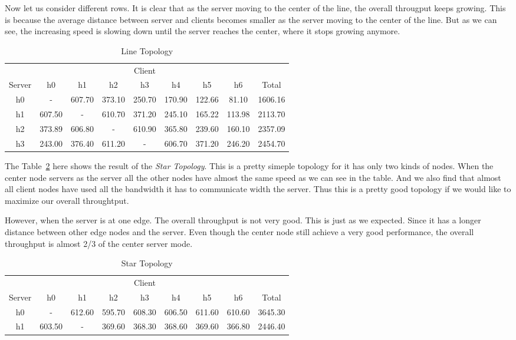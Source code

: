Now let us consider different rows. It is clear that as the server moving to the center of 
the line, the overall througput keeps growing. This is because the average distance between
server and clients becomes smaller as the server moving to the center of the line. But as we 
can see, the increasing speed is slowing down until the server reaches the center, where it 
stops growing anymore.
\begin{table}
	\renewcommand{\arraystretch}{1.3}
	\caption{Line Topology}
	\label{table:line}
	\setlength\tabcolsep{4pt} %
	\centering
	\begin{tabular}{|c||c|c|c|c|c|c|c||c|}
		\hline
		       & \multicolumn{7}{c||}{Client} &  \\ \hhline{|~||-------||~|}
		Server & h0 & h1 & h2 & h3 & h4 & h5 & h6 & Total\\
\hline\hline
h0 &     -    &  607.70  &  373.10  &  250.70  &  170.90  &  122.66  &  81.10  & 1606.16 \\
\hline
h1 &  607.50  &     -    &  610.70  &  371.20  &  245.10  &  165.22  &  113.98  & 2113.70 \\
\hline
h2 &  373.89  &  606.80  &     -    &  610.90  &  365.80  &  239.60  &  160.10  & 2357.09 \\
\hline
h3 &  243.00  &  376.40  &  611.20  &     -    &  606.70  &  371.20  &  246.20  & 2454.70 \\
\hline
	\end{tabular}
\end{table}

The Table~\ref{table:star} here shows the result of the {\it Star Topology}. This is a pretty
simeple topology for it has only two kinds of nodes. When the center node servers as the server 
all the other nodes have almost the same speed as we can see in the table. And we also find that 
almost all client nodes have used all the bandwidth it has to communicate width the server.
Thus this is a pretty good topology if we would like to maximize our overall throughtput.

However, when the server is at one edge. The overall throughput is not very good. This is just as
we expected. Since it has a longer distance between other edge nodes and the server. Even though 
the center node still achieve a very good performance, the overall throughput is almost 2/3 of the
center server mode.
\begin{table}
	\renewcommand{\arraystretch}{1.3}
	\caption{Star Topology}
	\label{table:star}
	\setlength\tabcolsep{4pt}
	\centering
	\begin{tabular}{|c||c|c|c|c|c|c|c||c|}
		\hline
		       & \multicolumn{7}{c||}{Client} &  \\ \hhline{|~||-------||~|}
		Server & h0 & h1 & h2 & h3 & h4 & h5 & h6 & Total\\
\hline\hline
h0 &     -    &  612.60  &  595.70  &  608.30  &  606.50  &  611.60  &  610.60  & 3645.30 \\
\hline
h1 &  603.50  &    -     &  369.60  &  368.30  &  368.60  &  369.60  &  366.80  & 2446.40 \\
\hline
	\end{tabular}
\end{table}

